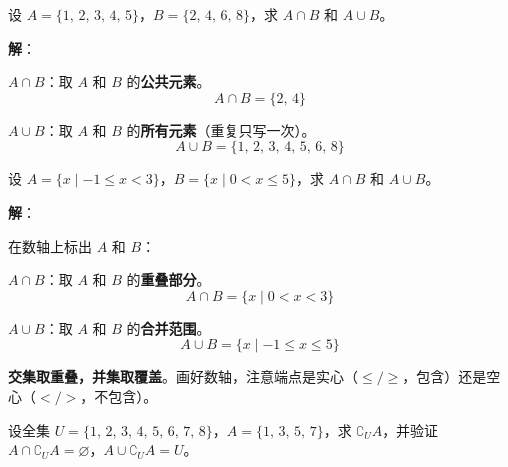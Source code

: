 \documentclass[12pt, a4paper]{ctexart}
\begin{document}
\begin{examplebox}[【例题4】交集与并集运算]
设 $A = \{1,\, 2,\, 3,\, 4,\, 5\}$，$B = \{2,\, 4,\, 6,\, 8\}$，求 $A \cap B$ 和 $A \cup B$。
\end{examplebox}

\textbf{解}：

$A \cap B$：取 $A$ 和 $B$ 的\textbf{公共元素}。
\[
A \cap B = \{2,\, 4\}
\]

$A \cup B$：取 $A$ 和 $B$ 的\textbf{所有元素}（重复只写一次）。
\[
A \cup B = \{1,\, 2,\, 3,\, 4,\, 5,\, 6,\, 8\}
\]

\begin{examplebox}[【例题5】用数轴求交集与并集]
设 $A = \{x \mid -1 \leqslant x < 3\}$，$B = \{x \mid 0 < x \leqslant 5\}$，求 $A \cap B$ 和 $A \cup B$。
\end{examplebox}

\textbf{解}：

在数轴上标出 $A$ 和 $B$：

\begin{center}
\end{center}

$A \cap B$：取 $A$ 和 $B$ 的\textbf{重叠部分}。
\[
A \cap B = \{x \mid 0 < x < 3\}
\]

$A \cup B$：取 $A$ 和 $B$ 的\textbf{合并范围}。
\[
A \cup B = \{x \mid -1 \leqslant x \leqslant 5\}
\]

\begin{tipbox}[数轴法口诀]
\textbf{交集取重叠，并集取覆盖}。画好数轴，注意端点是实心（$\leqslant/\geqslant$，包含）还是空心（$</>$，不包含）。
\end{tipbox}

\begin{examplebox}[【例题6】补集运算]
设全集 $U = \{1,\, 2,\, 3,\, 4,\, 5,\, 6,\, 7,\, 8\}$，$A = \{1,\, 3,\, 5,\, 7\}$，求 $\complement_U A$，并验证 $A \cap \complement_U A = \varnothing$，$A \cup \complement_U A = U$。
\end{examplebox}
\end{document}
